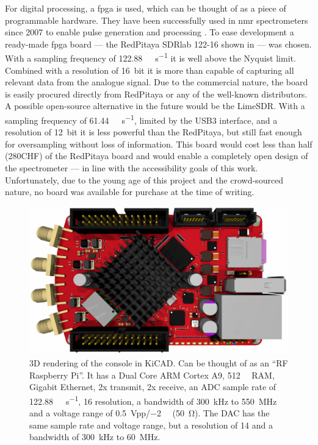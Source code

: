 For digital processing, a \acrfull{fpga} is used, which can be thought of as a piece of programmable hardware. They have been successfully used in \acrshort{nmr} spectrometers since 2007 to enable pulse generation and processing . To ease development a ready-made \acrshort{fpga} board --- the RedPitaya SDRlab 122-16 shown in  --- was chosen. With a sampling frequency of \qty{122.88}{\mega\sample\per\second} it is well above the Nyquist limit. Combined with a resolution of \qty{16}{bit} it is more than capable of capturing all relevant data from the analogue signal. Due to the commercial nature, the board is easily procured directly from RedPitaya or any of the well-known distributors. A possible open-source alternative in the future would be the LimeSDR. With a sampling frequency of \qty{61.44}{\mega\sample\per\second}, limited by the USB3 interface, and a resolution of \qty{12}{bit} it is less powerful than the RedPitaya, but still fast enough for oversampling without loss of information. This board would cost less than half (\approx 280CHF) of the RedPitaya board and would enable a completely open design of the spectrometer --- in line with the accessibility goals of this work. Unfortunately, due to the young age of this project and the crowd-sourced nature, no board was available for purchase at the time of writing.

\begin{figure}[hbt]
    \centering
    \includegraphics{images/rp122-16.png}
    \caption{ 3D rendering of the console in KiCAD. Can be thought of as an \enquote{RF Raspberry Pi}. It has a Dual Core ARM Cortex A9, \qty{512}{\mega\byte} RAM, Gigabit Ethernet, 2x transmit, 2x receive, an ADC sample rate of \qty{122.88}{\mega\sample\per\second}, \qty{16}{\bit} resolution, a bandwidth of \qty{300}{\kilo\hertz} to \qty{550}{\mega\hertz} and a voltage range of \qty{0.5}{Vpp}/\qty{-2}{\deci\belm} (\qty{50}{\ohm}). The DAC has the same sample rate and voltage range, but a resolution of \qty{14}{\bit} and a bandwidth of \qty{300}{\kilo\hertz} to \qty{60}{\mega\hertz}.}
\end{figure}

